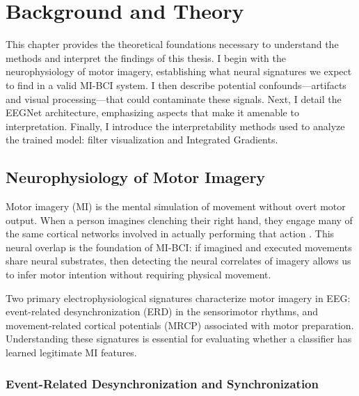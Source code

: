 \chapter{Background and Theory}
\label{ch:background}

This chapter provides the theoretical foundations necessary to understand the methods and interpret the findings of this thesis. I begin with the neurophysiology of motor imagery, establishing what neural signatures we expect to find in a valid MI-BCI system. I then describe potential confounds—artifacts and visual processing—that could contaminate these signals. Next, I detail the EEGNet architecture, emphasizing aspects that make it amenable to interpretation. Finally, I introduce the interpretability methods used to analyze the trained model: filter visualization and Integrated Gradients.


\section{Neurophysiology of Motor Imagery}
\label{sec:bg_neurophysiology}

Motor imagery (MI) is the mental simulation of movement without overt motor output. When a person imagines clenching their right hand, they engage many of the same cortical networks involved in actually performing that action \cite{pfurtscheller2001motor}. This neural overlap is the foundation of MI-BCI: if imagined and executed movements share neural substrates, then detecting the neural correlates of imagery allows us to infer motor intention without requiring physical movement.

Two primary electrophysiological signatures characterize motor imagery in EEG: event-related desynchronization (ERD) in the sensorimotor rhythms, and movement-related cortical potentials (MRCP) associated with motor preparation. Understanding these signatures is essential for evaluating whether a classifier has learned legitimate MI features.


\subsection{Event-Related Desynchronization and Synchronization}
\label{subsec:bg_erds}

